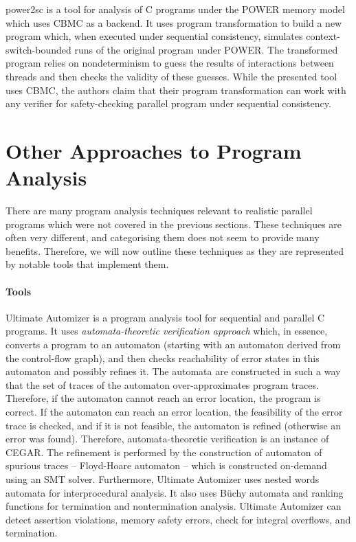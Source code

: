 power2sc  is a tool for analysis of C programs under the POWER memory model which uses CBMC as a backend.
It uses program transformation to build a new program which, when executed under sequential consistency, simulates context-switch-bounded runs of the original program under POWER.
The transformed program relies on nondeterminism to guess the results of interactions between threads and then checks the validity of these guesses.
While the presented tool uses CBMC, the authors claim that their program transformation can work with any verifier for safety-checking parallel program under sequential consistency.


\section{Other Approaches to Program Analysis}

There are many program analysis techniques relevant to realistic parallel programs which were not covered in the previous sections.
These techniques are often very different, and categorising them does not seem to provide many benefits.
Therefore, we will now outline these techniques as they are represented by notable tools that implement them.

\paragraph{Tools}

Ultimate Automizer  is a program analysis tool for sequential and parallel C programs.
It uses \emph{automata-theoretic verification approach} which, in essence, converts a program to an automaton (starting with an automaton derived from the control-flow graph), and then checks reachability of error states in this automaton and possibly refines it.
The automata are constructed in such a way that the set of traces of the automaton over-approximates program traces.
Therefore, if the automaton cannot reach an error location, the program is correct.
If the automaton can reach an error location, the feasibility of the error trace is checked, and if it is not feasible, the automaton is refined (otherwise an error was found).
Therefore, automata-theoretic verification is an instance of CEGAR.
The refinement is performed by the construction of automaton of spurious traces -- Floyd-Hoare automaton -- which is constructed on-demand using an SMT solver.
Furthermore, Ultimate Automizer uses nested words automata for interprocedural analysis.
It also uses Büchy automata and ranking functions for termination and nontermination analysis.
Ultimate Automizer can detect assertion violations, memory safety errors, check for integral overflows, and termination.

